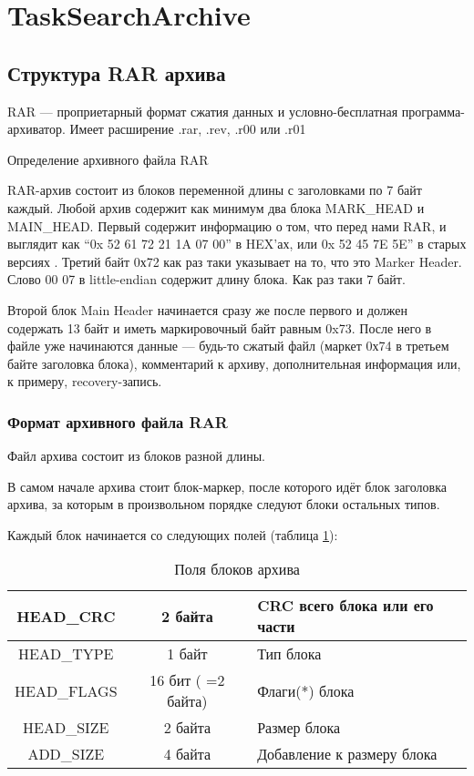 \section{TaskSearchArchive}

\subsection{Структура RAR архива}
RAR — проприетарный формат сжатия данных и условно-бесплатная программа-архиватор. Имеет расширение .rar, .rev, .r00 или .r01

Определение архивного файла RAR

RAR-архив состоит из блоков переменной длины с заголовками по 7 байт каждый. Любой архив содержит как минимум два блока MARK\_HEAD и MAIN\_HEAD. Первый содержит информацию о том, что перед нами RAR, и выглядит как ``0x 52 61 72 21 1A 07 00'' в HEX'ах, или 0x 52 45 7E 5E” в старых версиях . Третий байт 0х72 как раз таки указывает на то, что это Marker Header. Слово 00 07 в little-endian содержит длину блока. Как раз таки 7 байт.\cite{rar}

Второй блок Main Header начинается сразу же после первого и должен содержать 13 байт и иметь маркировочный байт равным 0x73. После него в файле уже начинаются данные — будь-то сжатый файл (маркет 0х74 в третьем байте заголовка блока), комментарий к архиву, дополнительная информация или, к примеру, recovery-запись.\cite{rarwiki}

\subsubsection{Формат архивного файла RAR}
                
Файл архива состоит из блоков разной длины.

В самом начале архива стоит блок-маркер, после которого идёт блок заголовка архива, за которым в произвольном порядке следуют блоки остальных типов.
                
Каждый блок начинается со следующих полей (таблица \ref{tab:blok}):         

\begin{table}[h]
 \caption{Поля блоков архива}
 \label{tab:blok}
 \begin{tabularx}{\textwidth}{|c|c|X|}
\hline
HEAD\_CRC & 2 байта & CRC всего блока или его части\\
\hline
HEAD\_TYPE & 1 байт & Тип блока \\
\hline
HEAD\_FLAGS & 16 бит ( =2 байта)& Флаги(*) блока\\
\hline
HEAD\_SIZE & 2 байта & Размер блока \\
\hline
ADD\_SIZE & 4 байта & Добавление к размеру блока\\
\hline
\end{tabularx}
\end{table}
            
